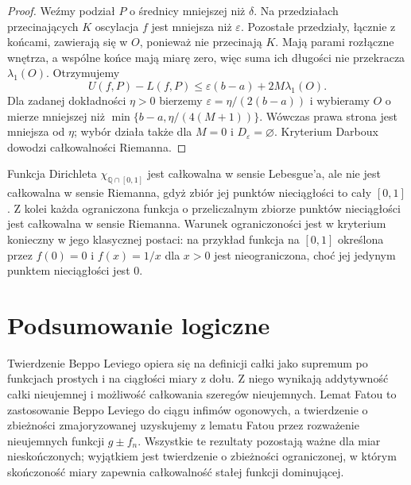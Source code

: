 \begin{proof}
Weźmy podział $P$ o średnicy mniejszej niż $\delta$.
Na przedziałach przecinających $K$ oscylacja $f$
jest mniejsza niż $\varepsilon$. Pozostałe przedziały, łącznie z końcami, zawierają się w $O$, ponieważ nie przecinają $K$. Mają parami rozłączne wnętrza, a wspólne końce mają miarę zero, więc suma ich długości nie przekracza $\lambda_1(O)$. Otrzymujemy
\[
U(f,P)-L(f,P)
\le\varepsilon(b-a)+2M\lambda_1(O).
\]
Dla zadanej dokładności $\eta>0$ bierzemy $\varepsilon=\eta/(2(b-a))$ i wybieramy $O$ o mierze mniejszej niż $\min\{b-a,\eta/(4(M+1))\}$. Wówczas prawa strona jest mniejsza od $\eta$; wybór działa także dla $M=0$ i $D_\varepsilon=\varnothing$. Kryterium Darboux dowodzi
całkowalności Riemanna.
\end{proof}

\begin{uwaga}
Funkcja Dirichleta $\chi_{\mathbb Q\cap[0,1]}$
jest całkowalna w sensie Lebesgue'a, ale
nie jest całkowalna w sensie Riemanna, gdyż
zbiór jej punktów nieciągłości to cały $[0,1]$.
Z kolei każda ograniczona funkcja o przeliczalnym
zbiorze punktów nieciągłości jest całkowalna
w sensie Riemanna. Warunek ograniczoności jest
w kryterium konieczny w jego klasycznej postaci:
na przykład funkcja na $[0,1]$ określona przez $f(0)=0$
i $f(x)=1/x$ dla $x>0$ jest nieograniczona, choć
jej jedynym punktem nieciągłości jest $0$.
\end{uwaga}

\section{Podsumowanie logiczne}

Twierdzenie Beppo Leviego opiera się na definicji
całki jako supremum po funkcjach prostych i na
ciągłości miary z dołu. Z niego wynikają
addytywność całki nieujemnej i możliwość całkowania
szeregów nieujemnych. Lemat Fatou to zastosowanie
Beppo Leviego do ciągu infimów ogonowych, a twierdzenie
o zbieżności zmajoryzowanej uzyskujemy z lematu Fatou
przez rozważenie nieujemnych funkcji $g\pm f_n$.
Wszystkie te rezultaty pozostają ważne dla miar
nieskończonych; wyjątkiem jest twierdzenie o zbieżności
ograniczonej, w którym skończoność miary
zapewnia całkowalność stałej funkcji dominującej.
